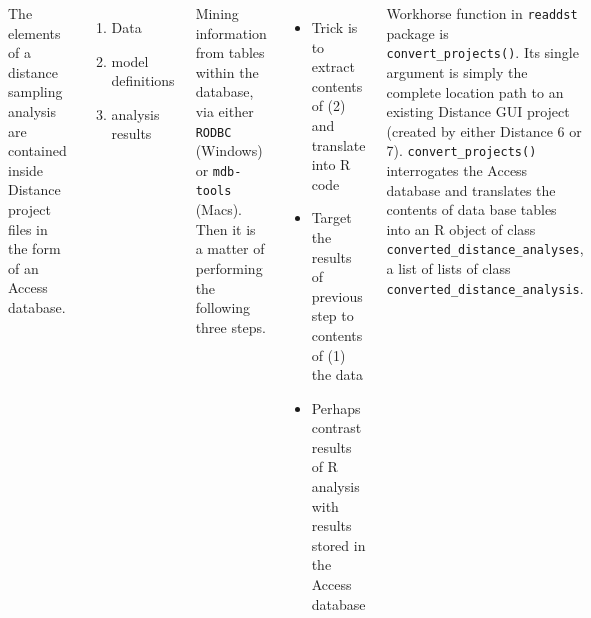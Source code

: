 \documentclass[14pt,a1paper,landscape]{tikzposter}
\begin{document}
\begin{columns}
{\begin{figure}
	\begin{tikzfigure}
		\includegraphics[width=.85\linewidth]{dst-file-structure.PNG}
	\end{tikzfigure}
\end{figure}

The elements of a distance sampling analysis are contained inside Distance project files in the form of an Access database.

\begin{enumerate}
	\item Data
	\item model definitions
	\item analysis results
\end{enumerate}

Mining information from tables within the database, via either \texttt{RODBC} (Windows) or \texttt{mdb-tools} (Macs).  Then it is a matter of performing the following three steps.

\begin{itemize}
	\item Trick is to extract contents of (2) and translate into R code
	\item Target the results of previous step to contents of (1) the data
	\item Perhaps contrast results of R analysis with results stored in the Access database
\end{itemize}

}

{
	Workhorse function in \texttt{readdst} package is \texttt{convert\_projects()}.  Its single argument is simply the complete location path to an existing Distance GUI project (created by either Distance 6 or 7).  \texttt{convert\_projects()} interrogates the Access database and translates the contents of data base tables into an R object of class \texttt{converted\_distance\_analyses}, a list of lists of class \texttt{converted\_distance\_analysis}.
}


\end{columns}
\end{document}
